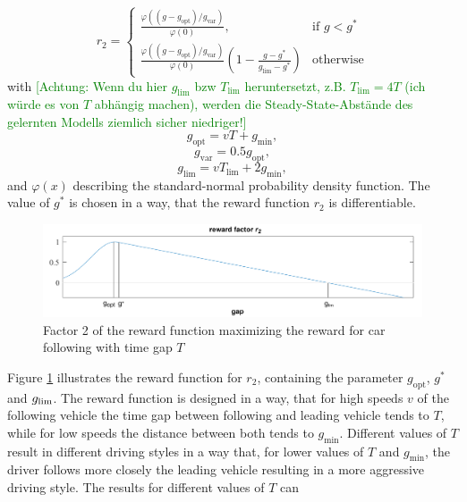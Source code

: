 \documentclass[review]{elsarticle}
\providecommand{\green}[1]{\textcolor{green}{#1}}
\providecommand{\martinc}[1]{\green{[#1]}} %
\providecommand{\sub}[1]{_{\mathrm{#1}}}  %
\providecommand{\3}{{\ss}}
\begin{document}
\begin{equation}
\label{eq:r2_CFP}
r_2  = 
\begin{cases}
\frac{\varphi((g-g\sub{opt})/g\sub{var})}{\varphi(0)},
& \text{if } g < g^*\\
\frac{\varphi((g-g\sub{opt})/g\sub{var})}{\varphi(0)}
\left(1-\frac{g-g^*}{g\sub{lim} - g^*}\right)  & \text{otherwise}
\end{cases}
\end{equation}
with \martinc{Achtung: Wenn du hier $g\sub{lim}$ bzw $T\sub{lim}$
  heruntersetzt, z.B. $T\sub{lim}=4T$ (ich w\"urde es von $T$
  abh\"angig machen), werden die Steady-State-Abst\"ande des gelernten
  Modells ziemlich sicher niedriger!}
\begin{equation}
\label{eq:r21}
g\sub{opt} = vT + g\sub{min},
\end{equation}
\begin{equation}
\label{eq:r22}
g\sub{var} = 0.5g\sub{opt},
\end{equation}
\begin{equation}
\label{eq:r23}
g\sub{lim} = vT\sub{lim} + 2g\sub{min},
\end{equation}
%
and $\varphi(x)$ describing the standard-normal probability density
function. The value of $g^*$ is chosen in a way, that the reward function $r_2$ is differentiable.
%
\begin{figure}
	\centering
	\includegraphics[width=12cm]{images/RewardFunc1}
	\caption{Factor 2 of the reward function maximizing the reward
		for car following with time gap $T$} 
	\label{fig:RewardFunc1}
\end{figure}
%
Figure \ref{fig:RewardFunc1} illustrates the reward function for
$r_2$, containing the parameter $g\sub{opt}$, $g^*$ and $g_{\rm
	lim}$. The reward function is designed in a way, that for high speeds $v$
of the following vehicle the time gap between following and leading
vehicle tends to $T$, while for low speeds the distance
between both tends to $g\sub{min}$. Different values of $T$
result in different driving styles in a way that, for lower values of
$T$ and $g\sub{min}$, the driver follows
more closely the leading vehicle resulting in a more aggressive
driving style. The results for different values of $T$ can
\end{document}
